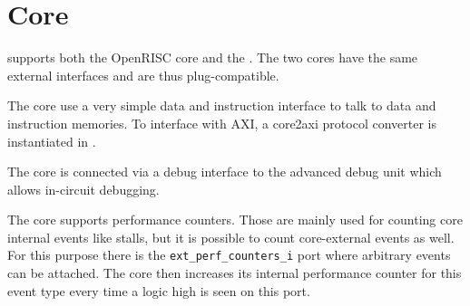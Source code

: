 \chapter{Core}

\pulpino supports both the OpenRISC \orion core and the \riscv \rvcore. The two
cores have the same external interfaces and are thus plug-compatible.

The core use a very simple data and instruction interface to talk to data and
instruction memories. To interface with AXI, a core2axi protocol converter is
instantiated in \pulpino.

The core is connected via a debug interface to the advanced debug unit which
allows in-circuit debugging.

The core supports performance counters. Those are mainly used for counting core
internal events like stalls, but it is possible to count core-external events
as well. For this purpose there is the \texttt{ext\_perf\_counters\_i} port where
arbitrary events can be attached. The core then increases its internal
performance counter for this event type every time a logic high is seen on this
port.
